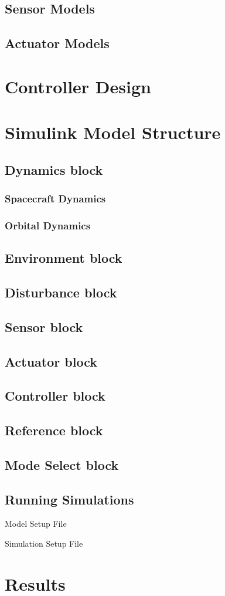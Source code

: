 \subsection{Sensor Models}

\subsection{Actuator Models}

\section{Controller Design}

\section{Simulink Model Structure}
\subsection{Dynamics block}
	\subsubsection{Spacecraft Dynamics} %
	\subsubsection{Orbital Dynamics} %
\subsection{Environment block} %
\subsection{Disturbance block} %
\subsection{Sensor block} %
\subsection{Actuator block} %
\subsection{Controller block} %
\subsection{Reference block} %
\subsection{Mode Select block} %
\subsection{Running Simulations}
Model Setup File

Simulation Setup File

\section{Results}
